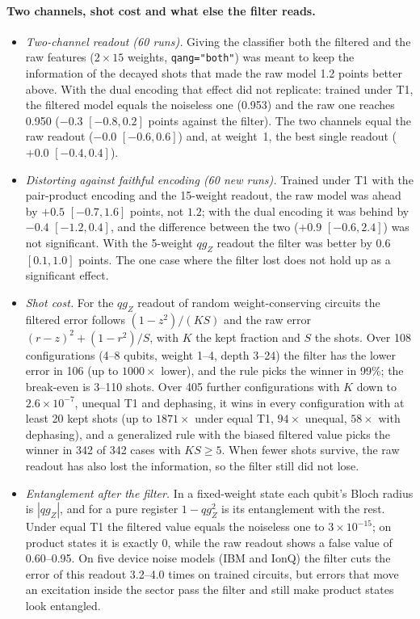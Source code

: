 \documentclass[11pt]{article}
\newcommand{\qZ}{qg_Z}
\begin{document}
\paragraph{Two channels, shot cost and what else the filter reads.}\label{sec:scaling}
\begin{itemize}
\item \textit{Two-channel readout (60 runs).} Giving the classifier both the filtered and the raw features
  ($2\times15$ weights, \texttt{qang="both"}) was meant to keep the information of the decayed shots that made the
  raw model 1.2 points better above. With the dual encoding that effect did not replicate: trained under T1, the
  filtered model equals the noiseless one (0.953) and the raw one reaches 0.950 ($-0.3$ $[-0.8,0.2]$ points
  against the filter). The two channels equal the raw readout ($-0.0$ $[-0.6,0.6]$) and, at weight~1, the best
  single readout ($+0.0$ $[-0.4,0.4]$).
\item \textit{Distorting against faithful encoding (60 new runs).} Trained under T1 with the pair-product encoding
  and the 15-weight readout, the raw model was ahead by $+0.5$ $[-0.7,1.6]$ points, not $1.2$; with the dual encoding
  it was behind by $-0.4$ $[-1.2,0.4]$, and the difference between the two ($+0.9$ $[-0.6,2.4]$) was not significant.
  With the 5-weight $\qZ$ readout the filter was better by $0.6$ $[0.1,1.0]$ points. The one case where the filter
  lost does not hold up as a significant effect.
\item \textit{Shot cost.} For the $\qZ$ readout of random weight-conserving circuits the filtered error
  follows $(1-z^2)/(KS)$ and the raw error $(r-z)^2+(1-r^2)/S$, with $K$ the kept fraction and $S$ the shots.
  Over 108 configurations (4--8 qubits, weight 1--4, depth 3--24) the filter has the lower error in 106 (up to
  $1000\times$ lower), and the rule picks the winner in 99\%; the break-even is 3--110 shots. Over 405 further
  configurations with $K$ down to $2.6\times10^{-7}$, unequal T1 and dephasing, it wins in every configuration
  with at least 20 kept shots (up to $1871\times$ under equal T1, $94\times$ unequal, $58\times$ with dephasing),
  and a generalized rule with the biased filtered value picks the winner in 342 of 342 cases with $KS\ge5$.
  When fewer shots survive, the raw readout has also lost the information, so the filter still did not lose.
\item \textit{Entanglement after the filter.} In a fixed-weight state each qubit's Bloch radius is $|\qZ|$, and
  for a pure register $1-\qZ^2$ is its entanglement with the rest. Under equal T1 the filtered value equals the
  noiseless one to $3\times10^{-15}$; on product states it is exactly 0, while the raw readout shows a false
  value of 0.60--0.95. On five device noise models (IBM and IonQ) the filter cuts the error of this readout
  3.2--4.0 times on trained circuits, but errors that move an excitation inside the sector pass the filter and still
  make product states look entangled.
\end{itemize}
\end{document}
